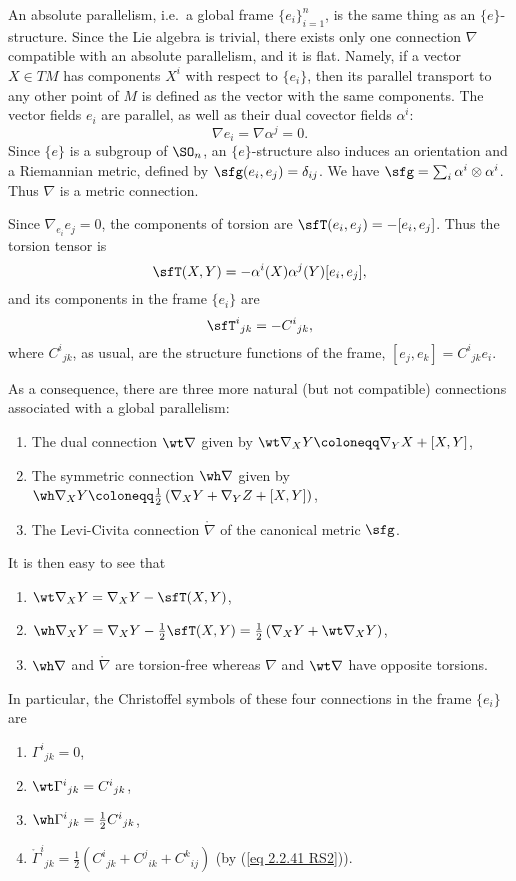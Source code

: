 \begin{example}
    An absolute parallelism, i.e.\ a global frame $\{e_i\}_{i=1}^n$, is the same thing as an $\{e\}$-structure. Since the Lie algebra is trivial, there exists only one connection $\nabla$ compatible with an absolute parallelism, and it is flat. Namely, if a vector $X\in TM$ has components $X^i$ with respect to $\{e_i\}$, then its parallel transport to any other point of $M$ is defined as the vector with the same components. The vector fields $e_i$ are parallel, as well as their dual covector fields $\alpha^i$:
    \[\nabla e_i=\nabla \alpha^j=0.\]
    Since $\{e\}$ is a subgroup of $\SO_n$, an $\{e\}$-structure also induces an orientation and a Riemannian metric, defined by $\sfg(e_i,e_j)=\delta_{ij}$. We have $\sfg=\sum_i \alpha^i\otimes\alpha^i$. Thus $\nabla$ is a metric connection.

    Since $\nabla_{e_i}e_j=0$, the components of torsion are $\sfT(e_i,e_j)=-[e_i,e_j]$. Thus the torsion tensor is
    \[\sfT(X,Y)=-\alpha^i(X)\alpha^j(Y)[e_i,e_j],\]
    and its components in the frame $\{e_i\}$ are 
    \[\sfT^i{}_{jk}=-C^i{}_{jk},\]
    where $C^i{}_{jk}$, as usual, are the structure functions of the frame, $[e_j,e_k]=C^i{}_{jk}e_i$.

    As a consequence, there are three more natural (but not compatible) connections associated with a global parallelism:
    \begin{enumerate}
        \item The dual connection $\wt\nabla$ given by $\wt\nabla_X Y\coloneqq \nabla_Y X+[X,Y]$,
        \item The symmetric connection $\wh\nabla$ given by $\wh\nabla_X Y\coloneqq \frac12\left(\nabla_X Y+\nabla_Y Z+[X,Y]\right)$,
        \item The Levi-Civita connection $\mathring{\nabla}$ of the canonical metric $\sfg$.
    \end{enumerate}
    It is then easy to see that 
    \begin{enumerate}
        \item $\wt\nabla_X Y=\nabla_X Y-\sfT(X,Y)$,
        \item $\wh\nabla_X Y=\nabla_X Y-\frac12\sfT(X,Y)=\frac12\left(\nabla_X Y+\wt\nabla_X Y\right)$,
        \item $\wh\nabla$ and $\mathring{\nabla}$ are torsion-free whereas $\nabla$ and $\wt\nabla$ have opposite torsions.
    \end{enumerate}
    In particular, the Christoffel symbols of these four connections in the frame $\{e_i\}$ are 
    \begin{enumerate}
        \item $\Gamma^i{}_{jk}=0$,
        \item $\wt\Gamma^i{}_{jk}=C^i{}_{jk}$,
        \item $\wh\Gamma^i{}_{jk}=\frac12 C^i{}_{jk}$,
        \item $\mathring{\Gamma}^i{}_{jk}=\frac12\left(C^i{}_{jk}+C^j{}_{ik}+C^k{}_{ij}\right)$ (by (\ref{eq 2.2.41 RS2})).
    \end{enumerate}
\end{example}


